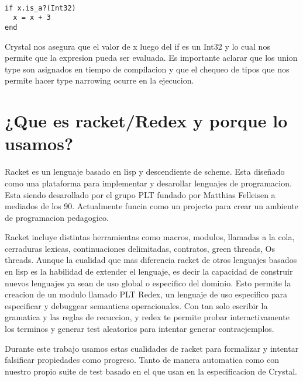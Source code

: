 \begin{verbatim}

if x.is_a?(Int32)
  x = x + 3
end

\end{verbatim}

Crystal nos asegura que  el valor de x luego del if es un Int32 y lo cual nos permite que la expresion pueda ser evaluada.
Es importante aclarar que los union type son asignados en tiempo de compilacion y que el chequeo de tipos que nos permite hacer type narrowing ocurre en la ejecucion.




\section{¿Que es racket/Redex y porque lo usamos?}

Racket es un lenguaje basado en lisp y descendiente de scheme. Esta diseñado como una plataforma para implementar y desarollar lenguajes de programacion.
Esta siendo desarollado por el grupo PLT fundado por Matthias Felleisen a mediados de los 90.
 Actualmente funcin como un projecto para crear un ambiente de programacion pedagogico.

 Racket incluye distintas herramientas como macros, modulos, llamadas a la cola, cerraduras lexicas, continuaciones delimitadas, contratos, green threads, Os threads.
 Aunque la cualidad que mas diferencia racket de otros lenguajes basados en lisp es la habilidad de extender el lenguaje, es decir la capacidad de construir nuevos lenguajes
 ya sean de uso global o especifico del dominio. Esto permite la creacion de un modulo llamado PLT Redex,
 un lenguaje de uso especifico para especificar y debuggear  semanticas operacionales. Con tan solo escribir la gramatica  y las reglas de recuccion, y redex te permite
 probar interactivamente los terminos y generar test aleatorios para intentar generar  contraejemplos. 

 Durante este trabajo usamos estas cualidades de racket para formalizar y intentar falsificar propiedades como progreso. Tanto de manera automatica como con nuestro propio 
 suite de test basado en el que usan en la especificacion de Crystal.
